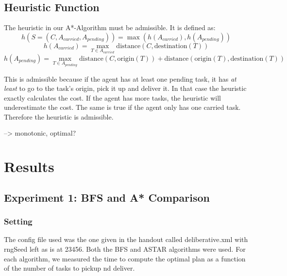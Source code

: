 \documentclass[11pt]{article}
\begin{document}
\subsection{Heuristic Function}
The heuristic in our A*-Algorithm must be admissible. It is defined as:
$$
h(S = (C, A_{carried}, A_{pending})) = \max (h(A_{carried}), h(A_{pending})) 
$$$$
h(A_{carried}) = \max_{T \in A_{carried}} \text{distance}(C, \text{destination}(T))
$$$$
h(A_{pending}) = \max_{T \in A_{pending}} \text{distance}(C, \text{origin}(T)) + 
\text{distance}(\text{origin}(T), \text{destination}(T))
$$

This is admissible because if the agent has at least one pending task, it has \textit{at least}
to go to the task's origin, pick it up and deliver it. In that case the heuristic exactly 
calculates the cost. If the agent has more tasks, the heuristic will underestimate the cost. 
The same is true if the agent only has one carried task. Therefore the heuristic 
is admissible.

--> monotonic, optimal?


\section{Results}

\subsection{Experiment 1: BFS and A* Comparison}

\subsubsection{Setting}
The config file used was the one given in the handout called deliberative.xml with rngSeed left as is at 23456. Both the BFS and ASTAR algorithms were used. For each algorithm, we measured the time to compute the optimal plan as a function of the number of tasks to pickup nd deliver.  
\end{document}
